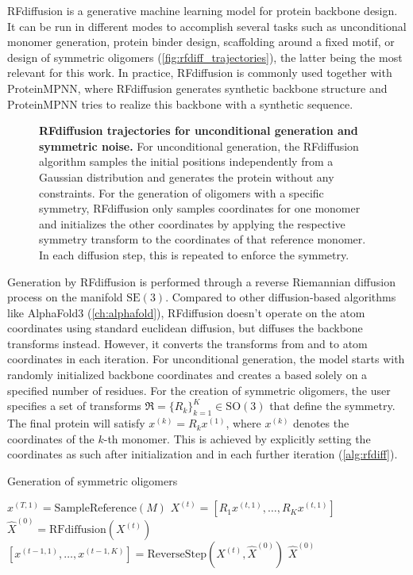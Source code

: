 RFdiffusion is a generative machine learning model for protein backbone design. It can be run in different modes to accomplish several tasks such as unconditional monomer generation, protein binder design, scaffolding around a fixed motif, or design of symmetric oligomers (\autoref{fig:rfdiff_trajectories}), the latter being the most relevant for this work. In practice, RFdiffusion is commonly used together with ProteinMPNN, where RFdiffusion generates synthetic backbone structure and ProteinMPNN tries to realize this backbone with a synthetic sequence. 

\begin{figure}
\centering

\caption{\textbf{RFdiffusion trajectories for unconditional generation and symmetric noise.} For unconditional generation, the RFdiffusion algorithm samples the initial positions independently from a Gaussian distribution and generates the protein without any constraints. For the generation of oligomers with a specific symmetry, RFdiffusion only samples coordinates for one monomer and initializes the other coordinates by applying the respective symmetry transform to the coordinates of that reference monomer. In each diffusion step, this is repeated to enforce the symmetry. }
\label{fig:rfdiff_trajectories}
\end{figure}

Generation by RFdiffusion is performed through a reverse Riemannian diffusion process on the manifold $\mathrm{SE}(3)$. Compared to other diffusion-based algorithms like AlphaFold3 (\autoref{ch:alphafold}), RFdiffusion doesn't operate on the atom coordinates using standard euclidean diffusion, but diffuses the backbone transforms instead. However, it converts the transforms from and to atom coordinates in each iteration. For unconditional generation, the model starts with randomly initialized backbone coordinates and creates a based solely on a specified number of residues. For the creation of symmetric oligomers, the user specifies a set of transforms $\mathfrak{R}=\{R_k\}_{k=1}^K \in \mathrm{SO}(3)$ that define the symmetry. The final protein will satisfy $x^{(k)} = R_k x^{(1)}$, where $x^{(k)}$ denotes the coordinates of the $k$-th monomer. This is achieved by explicitly setting the coordinates as such after initialization and in each further iteration (\autoref{alg:rfdiff}). 

\begin{algorithm}
    \caption{Generation of symmetric oligomers}
    \begin{algorithmic}[1]
    \State $x^{(T,1)} = \text{SampleReference}(M)$
        \State $X^{(t)} = [R_1 x^{(t,1)}, \ldots, R_K x^{(t,1)}]$
        \State $\hat{X}^{(0)} = \text{RFdiffusion}(X^{(t)})$
        \State $[x^{(t-1,1)}, \ldots, x^{(t-1,K)}] = \text{ReverseStep}(X^{(t)}, \hat{X}^{(0)})$
    \EndFor
    \State \Return $\hat{X}^{(0)}$
    \end{algorithmic}
    \label{alg:rfdiff}
\end{algorithm}

